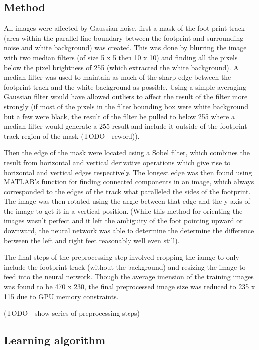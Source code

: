 \documentclass{article}
\begin{document}
\subsection{Method}
All images were affected by Gaussian noise, first a mask of the foot print track (area within the parallel line boundary between the footprint and surrounding noise and white background) was created. This was done by blurring the image with two median filters (of size 5 x 5 then 10 x 10) and finding all the pixels below the pixel brightness of 255 (which extracted the white background). A median filter was used to maintain as much of the sharp edge between the footprint track and the white background as possible. Using a simple averaging Gaussian filter would have allowed outliers to affect the result of the filter more strongly (if most of the pixels in the filter bounding box were white background but a few were black, the result of the filter be pulled to below 255 where a median filter would generate a 255 result and include it outside of the footprint track region of the mask (TODO - reword)).

Then the edge of the mask were located using a Sobel filter, which combines the result from horizontal and vertical derivative operations which give rise to horizontal and vertical edges respectively. The longest edge was then found using MATLAB's function for finding connected components in an image, which always corresponded to the edges of the track what paralleled the sides of the footprint. The image was then rotated using the angle between that edge and the y axis of the image to get it in a vertical position. (While this method for orienting the images wasn't perfect and it left the ambiguity of the foot pointing upward or downward, the neural network was able to determine the determine the difference between the left and right feet reasonably well even still).

The final steps of the preprocessing step involved cropping the iamge to only include the footprint track (without the background) and resizing the image to feed into the neural network. Though the average imension of the training images was found to be 470 x 230, the final preprocessed image size was reduced to 235 x 115 due to GPU memory constraints.

(TODO - show series of preprocessing steps)

\subsection{Learning algorithm}
\end{document}
